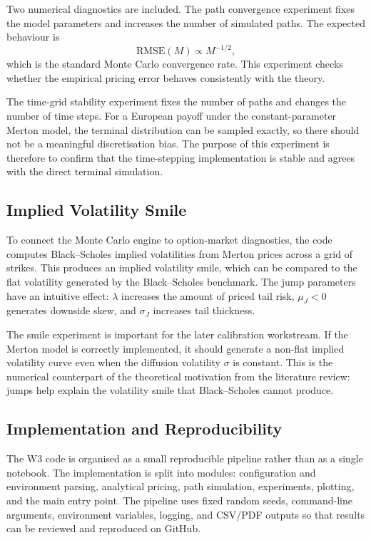 \documentclass[12pt]{article}
\begin{document}
Two numerical diagnostics are included. The path convergence experiment fixes the model parameters and increases the number of simulated paths. The expected behaviour is
\begin{equation}
\mathrm{RMSE}(M)\propto M^{-1/2},
\end{equation}
which is the standard Monte Carlo convergence rate. This experiment checks whether the empirical pricing error behaves consistently with the theory.

The time-grid stability experiment fixes the number of paths and changes the number of time steps. For a European payoff under the constant-parameter Merton model, the terminal distribution can be sampled exactly, so there should not be a meaningful discretisation bias. The purpose of this experiment is therefore to confirm that the time-stepping implementation is stable and agrees with the direct terminal simulation.

\subsection*{Implied Volatility Smile}

To connect the Monte Carlo engine to option-market diagnostics, the code computes Black--Scholes implied volatilities from Merton prices across a grid of strikes. This produces an implied volatility smile, which can be compared to the flat volatility generated by the Black--Scholes benchmark. The jump parameters have an intuitive effect: $\lambda$ increases the amount of priced tail risk, $\mu_J<0$ generates downside skew, and $\sigma_J$ increases tail thickness.

The smile experiment is important for the later calibration workstream. If the Merton model is correctly implemented, it should generate a non-flat implied volatility curve even when the diffusion volatility $\sigma$ is constant. This is the numerical counterpart of the theoretical motivation from the literature review: jumps help explain the volatility smile that Black--Scholes cannot produce.

\subsection*{Implementation and Reproducibility}

The W3 code is organised as a small reproducible pipeline rather than as a single notebook. The implementation is split into modules: configuration and environment parsing, analytical pricing, path simulation, experiments, plotting, and the main entry point. The pipeline uses fixed random seeds, command-line arguments, environment variables, logging, and CSV/PDF outputs so that results can be reviewed and reproduced on GitHub.
\end{document}
